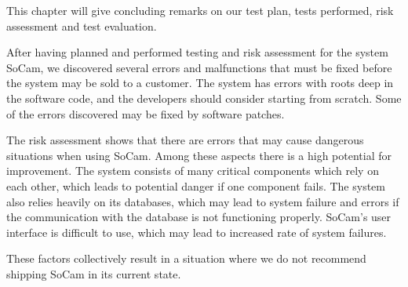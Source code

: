 		This chapter will give concluding remarks on our test plan, tests performed, risk 
		assessment and test evaluation. 

		After having planned and performed testing and risk assessment for the system SoCam, 
		we discovered several errors and malfunctions that must be fixed before the system may 
		be sold to a customer. The system has errors with roots deep in the software code, and 
		the developers should consider starting from scratch. Some of the errors discovered may 
		be fixed by software patches. 

		The risk assessment shows that there are errors that may cause dangerous situations when 
		using SoCam. Among these aspects there is a high potential for improvement. The system 
		consists of many critical components which rely on each other, which leads to potential 
		danger if one component fails. The system also relies heavily on its databases, which may 
		lead to system failure and errors if the communication with the database is not functioning 
		properly. SoCam’s user interface is difficult to use, which may lead to increased rate of 
		system failures. 

		These factors collectively result in a situation where we do not recommend shipping SoCam in 
		its current state.


